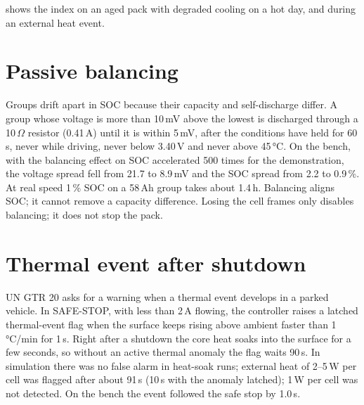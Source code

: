  shows the index on an aged pack with degraded cooling on a hot day, and during an external heat event.


\section{Passive balancing}
Groups drift apart in SOC because their capacity and self-discharge differ. A group whose voltage is more than 10\,mV above the lowest is discharged through a 10\,$\Omega$ resistor (0.41\,A) until it is within 5\,mV, after the conditions have held for 60\,s, never while driving, never below 3.40\,V and never above 45\,°C. On the bench, with the balancing effect on SOC accelerated 500 times for the demonstration, the voltage spread fell from 21.7 to 8.9\,mV and the SOC spread from 2.2 to 0.9\,\%. At real speed 1\,\% SOC on a 58\,Ah group takes about 1.4\,h. Balancing aligns SOC; it cannot remove a capacity difference. Losing the cell frames only disables balancing; it does not stop the pack. 

\section{Thermal event after shutdown}
UN GTR 20 asks for a warning when a thermal event develops in a parked vehicle. In SAFE-STOP, with less than 2\,A flowing, the controller raises a latched thermal-event flag when the surface keeps rising above ambient faster than 1\,°C/min for 1\,s. Right after a shutdown the core heat soaks into the surface for a few seconds, so without an active thermal anomaly the flag waits 90\,s. In simulation there was no false alarm in heat-soak runs; external heat of 2--5\,W per cell was flagged after about 91\,s (10\,s with the anomaly latched); 1\,W per cell was not detected. On the bench the event followed the safe stop by 1.0\,s.

